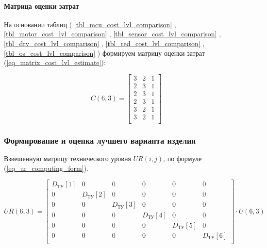 \paragraph{Матрица оценки затрат}

На основании таблиц (
    \ref{tbl_mcu_cost_lvl_comparison}
  , \ref{tbl_motor_cost_lvl_comparison}
  , \ref{tbl_sensor_cost_lvl_comparison}
  , \ref{tbl_drv_cost_lvl_comparison}
  , \ref{tbl_red_cost_lvl_comparison}
  , \ref{tbl_os_cost_lvl_comparison}
)
формируем матрицу оценки затрат
(\ref{eq_matrix_cost_lvl_estimate}):

\begin{equation}
    C(6,3) =
    \begin{bmatrix}
        3 & 2 & 1 \\
        2 & 3 & 1 \\
        2 & 3 & 1 \\
        2 & 3 & 1 \\
        3 & 2 & 1 \\
        3 & 2 & 1 \\
    \end{bmatrix}
    \label{eq_matrix_cost_lvl_estimate}
\end{equation}

\subsubsection{Формирование и оценка лучшего варианта изделия}
Взвешенную матрицу технического уровня $UR(i, j)$, по формуле
(\ref{eq_ur_computing_form}).

\begin{equation}
    UR(6,3) =
        \begin{bmatrix}
            D_\text{ТУ}[1] & 0 & 0 & 0 & 0 & 0 \\
            0 & D_\text{ТУ}[2] & 0 & 0 & 0 & 0 \\
            0 & 0 & D_\text{ТУ}[3] & 0 & 0 & 0 \\
            0 & 0 & 0 & D_\text{ТУ}[4] & 0 & 0 \\
            0 & 0 & 0 & 0 & D_\text{ТУ}[5] & 0 \\
            0 & 0 & 0 & 0 & 0 & D_\text{ТУ}[6] \\
        \end{bmatrix}
        \cdot
        U(6,3)
    \label{eq_ur_computing_form}
\end{equation}

